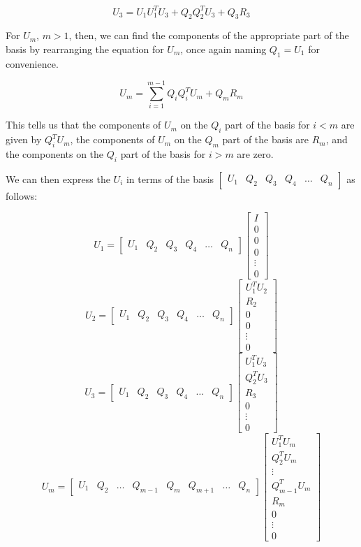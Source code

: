 \documentclass[english]{article}
\begin{document}
\begin{enumerate}
$$U_3 = U_1 U_1^T U_3 + Q_2 Q_2^T U_3 + Q_3 R_3 $$

For $U_m$, $m > 1$, then, we can find the components of the appropriate part of the basis by rearranging the equation for $U_m$, once again naming $Q_1 = U_1$ for convenience.

$$U_m = \sum_{i=1}^{m-1}Q_i Q_i^T U_m + Q_m R_m$$

This tells us that the components of $U_m$ on the $Q_i$ part of the basis for $i < m$ are given by $Q_i^T U_m$, the components of $U_m$ on the $Q_m$ part of the basis are $R_m$, and the components on the $Q_i$ part of the basis for $i > m$ are zero.

We can then express the $U_i$ in terms of the basis $\left[\begin{array}{cccccc} U_1 & Q_2 & Q_3 & Q_4 & \ldots & Q_n\end{array}\right]$ as follows:

$$U_1 = \left[\begin{array}{cccccc} U_1 & Q_2 & Q_3 & Q_4 & \ldots & Q_n\end{array}\right] \left[\begin{array}{c} I \\ 0 \\ 0 \\ 0\\ \vdots \\ 0\end{array}\right]$$
$$U_2 = \left[\begin{array}{cccccc} U_1 & Q_2 & Q_3 & Q_4 &\ldots & Q_n\end{array}\right] \left[\begin{array}{c} U_1^T U_2 \\ R_2 \\ 0 \\ 0 \\ \vdots \\ 0 \end{array}\right]$$
$$U_3 = \left[\begin{array}{cccccc} U_1 & Q_2 & Q_3 & Q_4 &\ldots & Q_n\end{array}\right] \left[\begin{array}{c} U_1^T U_3 \\ Q_2^T U_3 \\ R_3 \\ 0 \\ \vdots \\ 0 \end{array}\right]$$
$$U_m = \left[\begin{array}{cccccccc} U_1 & Q_2 & \ldots & Q_{m-1} & Q_m & Q_{m+1} & \ldots & Q_n\end{array}\right] \left[\begin{array}{c} U_1^T U_m \\ Q_2^T U_m \\ \vdots \\ Q_{m-1}^T U_m \\ R_m \\ 0 \\ \vdots \\ 0 \end{array}\right]$$


\end{enumerate}
\end{document}
